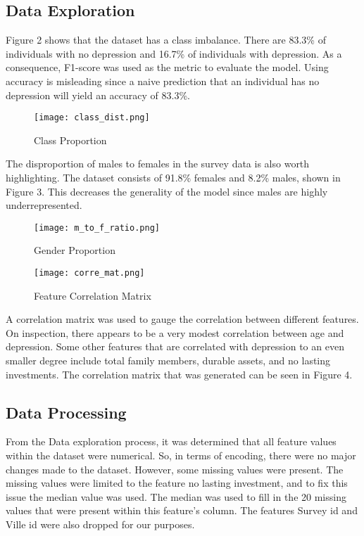 \documentclass[conference]{IEEEtran}
\begin{document}
\subsection{Data Exploration}
Figure 2 shows that the dataset has a class imbalance. There are 83.3\% of individuals with no depression and 16.7\% of individuals with depression. As a consequence, F1-score was used as the metric to evaluate the model. Using accuracy is misleading since a naive prediction that an individual has no depression will yield an accuracy of 83.3\%.
\begin{figure}[hbt!]
\centering
\texttt{[image: class\_dist.png]}
\caption{Class Proportion\label{overflow}}
\end{figure}

The disproportion of males to females in the survey data is also worth highlighting. The dataset consists of 91.8\% females and 8.2\% males, shown in Figure 3. This decreases the generality of the model since males are highly underrepresented.
\begin{figure}[hbt!]
\centering
\texttt{[image: m\_to\_f\_ratio.png]}
\caption{Gender Proportion\label{overflow}}
\end{figure}

\begin{figure}[ht!]
\centering
\texttt{[image: corre\_mat.png]}
\caption{Feature Correlation Matrix\label{overflow}}
\end{figure}

A correlation matrix was used to gauge the correlation between different features. On inspection, there appears to be a very modest correlation between age and depression. Some other features that are correlated with depression to an even smaller degree include total family members, durable assets, and no lasting investments. The correlation matrix that was generated can be seen in Figure 4.


\subsection{Data Processing}
From the Data exploration process, it was determined that all feature values within the dataset were numerical. So, in terms of encoding, there were no major changes made to the dataset. However, some missing values were present. The missing values were limited to the feature no lasting investment, and to fix this issue the median value was used. The median was used to fill in the 20 missing values that were present within this feature's column. The features Survey id and Ville id were also dropped for our purposes.
\end{document}

